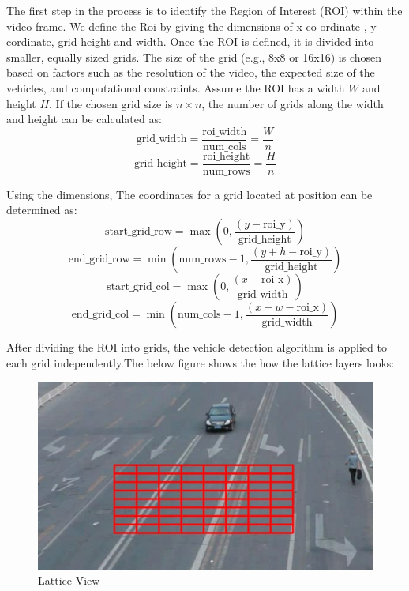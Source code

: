 \documentclass[conference]{IEEEtran}
\begin{document}
The first step in the process is to identify the Region of Interest (ROI) within the video frame.
We define the Roi by giving the dimensions of x co-ordinate , y-cordinate, grid height
and width. Once the ROI is defined, it is divided into smaller, equally sized grids. The size
of the grid (e.g., 8x8 or 16x16) is chosen based on factors such as the resolution of the video,
the expected size of the vehicles, and computational constraints.
Assume the ROI has a width \( W \) and height \( H \). If the chosen grid size is \( n \times n \), the number of grids along the width and height can be calculated as:
\[
\text{grid\_width} = \frac{\text{roi\_width}}{\text{num\_cols}} = \frac{W}{n}
\]
\[
\text{grid\_height} = \frac{\text{roi\_height}}{\text{num\_rows}} = \frac{H}{n}
\]

Using the dimensions, The coordinates for a grid located at position can be determined as:
\[
\text{start\_grid\_row} = \max\left(0, \frac{(y - \text{roi\_y})}{\text{grid\_height}}\right)
\]
\[
\text{end\_grid\_row} = \min\left(\text{num\_rows} - 1, \frac{(y + h - \text{roi\_y})}{\text{grid\_height}}\right)
\]
\[
\text{start\_grid\_col} = \max\left(0, \frac{(x - \text{roi\_x})}{\text{grid\_width}}\right)
\]
\[
\text{end\_grid\_col} = \min\left(\text{num\_cols} - 1, \frac{(x + w - \text{roi\_x})}{\text{grid\_width}}\right)
\]

After dividing the ROI into grids, the vehicle detection algorithm is applied to each grid independently.The below figure shows the how the lattice layers looks:
\begin{figure}[h]
    \centering
    \includegraphics[width=0.7\linewidth]{grid1.png}
    \caption{Lattice View}
    \label{fig:enter-label}
\end{figure}
\end{document}
